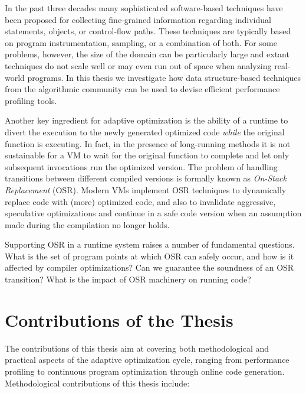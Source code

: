 In the past three decades many sophisticated software-based techniques have been proposed for collecting fine-grained information regarding individual statements, objects, or control-flow paths. These techniques are typically based on program instrumentation, sampling, or a combination of both. For some problems, however, the size of the domain can be particularly large and extant techniques do not scale well or may even run out of space when analyzing real-world programs. In this thesis we investigate how data structure-based techniques from the algorithmic community can be used to devise efficient performance profiling tools. %


Another key ingredient for adaptive optimization is the ability of a runtime to divert the execution to the newly generated optimized code {\em while} the original function is executing. In fact, in the presence of long-running methods it is not sustainable for a VM to wait for the original function to complete and let only subsequent invocations run the optimized version. The problem of handling transitions between different compiled versions is formally known as {\em On-Stack Replacement} (OSR). Modern VMs implement OSR techniques to dynamically replace code with (more) optimized code, and also to invalidate aggressive, speculative optimizations and continue in a safe code version when an assumption made during the compilation no longer holds.

Supporting OSR in a runtime system raises a number of fundamental questions. What is the set of program points at which OSR can safely occur, and how is it affected by compiler optimizations? Can we guarantee the soundness of an OSR transition? What is the impact of OSR machinery on running code? 

\section{Contributions of the Thesis}

The contributions of this thesis aim at covering both methodological and practical aspects of the adaptive optimization cycle, ranging from performance profiling to continuous program optimization through online code generation. Methodological contributions of this thesis include:


